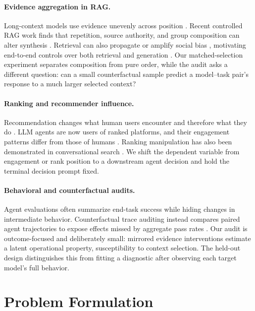 \documentclass[11pt,letterpaper]{article}
\begin{document}
\paragraph{Evidence aggregation in RAG.}
Long-context models use evidence unevenly across position
\citep{liu2024lost,guo2024order}. Recent controlled RAG work finds that
repetition, source authority, and group composition can alter synthesis
\citep{li2025authority,naphade2026rational}. Retrieval can also propagate or
amplify social bias \citep{zhang2026retrievalbias}, motivating end-to-end
controls over both retrieval and generation \citep{haque2026fairrag}. Our
matched-selection experiment separates composition from pure order, while the
audit asks a different question: can a small counterfactual sample predict a
model--task pair's response to a much larger selected context?

\paragraph{Ranking and recommender influence.}
Recommendation changes what human users encounter and therefore what they do
\citep{narayanan2023algorithmic}. LLM agents are now users of ranked platforms,
and their engagement patterns differ from those of humans
\citep{li2026moltbook}. Ranking manipulation has also been demonstrated in
conversational search \citep{pfrommer2024ranking}. We shift the dependent
variable from engagement or rank position to a downstream agent decision and
hold the terminal decision prompt fixed.

\paragraph{Behavioral and counterfactual audits.}
Agent evaluations often summarize end-task success while hiding changes in
intermediate behavior. Counterfactual trace auditing instead compares paired
agent trajectories to expose effects missed by aggregate pass rates
\citep{zhou2026counterfactual}. Our audit is outcome-focused and deliberately
small: mirrored evidence interventions estimate a latent operational property,
susceptibility to context selection. The held-out design distinguishes this
from fitting a diagnostic after observing each target model's full behavior.

\section{Problem Formulation}
\label{sec:formulation}
\end{document}
